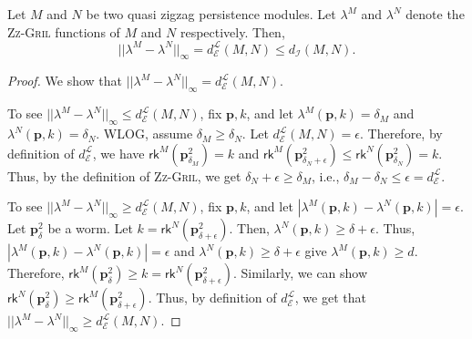 \documentclass{article}
\newcommand{\zzgril}{\textsc{Zz-Gril}}
\newcommand{\qzzmod}{quasi zigzag persistence module}
\newcommand{\RKG}{\mathsf{rk}}
\newcommand{\vp}{\mathbf{p}}
\theoremstyle{plain}
\theoremstyle{definition}
\theoremstyle{remark}
\newcommand{\theoremofref}{}
\newenvironment{theoremof}[1]
 {\renewcommand{\theoremofref}{#1}\ztheoremof}
 {\ztheoremof}
\begin{document}
\begin{theoremof}{\ref{thm:stability_zzgril}}\label{aprop:stability_zzgril}
    Let $M$ and $N$ be two \qzzmod s. Let $\lambda^M$ and $\lambda^N$ denote the \zzgril{} functions of $M$ and $N$  respectively. Then, 
    \begin{equation*}
        ||\lambda^M - \lambda^N||_\infty = d_\mathcal{E}^{\mathcal{L}}(M,N) \leq d_\mathcal{I}(M,N).
    \end{equation*}
\end{theoremof}

\begin{proof}
    We show that $||\lambda^M - \lambda^N||_\infty = d_\mathcal{E}^\mathcal{L}(M,N)$. 
    
    To see $||\lambda^M - \lambda^N||_\infty \leq d_\mathcal{E}^\mathcal{L}(M,N)$, fix $\vp, k$, and let $\lambda^M(\vp,k) = \delta_M$ and $\lambda^N(\vp,k) = \delta_N$. WLOG, assume $\delta_M \geq \delta_N$. Let $d_\mathcal{E}^\mathcal{L}(M,N) = \epsilon$. Therefore, by definition of $d_\mathcal{E}^\mathcal{L}$, we have $\RKG^M\left (\boxed{\vp}^2_{\delta_M}\right) = k$ and $\RKG^M\left (\boxed{\vp}^2_{\delta_N + \epsilon}\right) \leq \RKG^N\left (\boxed{\vp}^2_{\delta_N}\right) = k$. Thus, by the definition of \zzgril{}, we get $\delta_N + \epsilon \geq \delta_M$, i.e., $\delta_M - \delta_N \leq \epsilon = d^\mathcal{L}_\mathcal{E}$.

    To see $||\lambda^M - \lambda^N||_\infty \geq d_\mathcal{E}^\mathcal{L}(M,N)$, fix $\vp, k$, and let $|\lambda^M(\vp,k) - \lambda^N(\vp,k)| = \epsilon$. Let $\boxed{\vp}^2_\delta$ be a worm. Let $k = \RKG^N\left (\boxed{\vp}^2_{\delta + \epsilon}\right)$. Then, $\lambda^N(\vp,k) \geq \delta + \epsilon$. Thus, $|\lambda^M(\vp,k) - \lambda^N(\vp,k)| = \epsilon$ and $\lambda^N(\vp,k) \geq \delta + \epsilon$ give $\lambda^M(\vp,k) \geq d$. Therefore, $\RKG^M\left (\boxed{\vp}^2_{\delta}\right) \geq k = \RKG^N\left (\boxed{\vp}^2_{\delta + \epsilon}\right)$. Similarly, we can show $\RKG^N\left (\boxed{\vp}^2_{\delta}\right) \geq  \RKG^M\left (\boxed{\vp}^2_{\delta + \epsilon}\right)$. Thus, by definition of $d_\mathcal{E}^\mathcal{L}$, we get that $||\lambda^M - \lambda^N||_\infty \geq d_\mathcal{E}^\mathcal{L}(M,N)$.
    
\end{proof}



\end{document}

